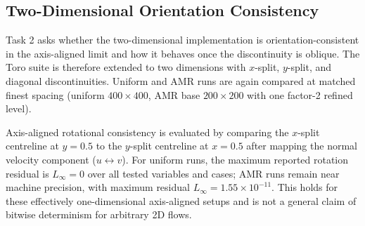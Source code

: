 \documentclass[final,3p,times,twocolumn]{elsarticle}
\newif\ifwithpaths
\DeclareRobustCommand{\pathnote}[1]{\ifwithpaths\textit{ [source: \nolinkurl{#1}]}\fi}
\begin{document}
\begin{table}[!htbp]
\centering
\scriptsize
{}
\caption{Supplementary single-level smooth Gaussian entropy-perturbation test on uniform grids with $\rho=1+0.05\exp(-r^2/0.12^2)$, $(u,v,p)=(0.2,0.15,1.0)$, and $t_\mathrm{end}=0.05$.\pathnote{Euler_AmrLevel/Exec/Euler1D/results_smooth_entropy_convergence_20260306_044020/checks/smooth_entropy_convergence.csv; Euler_AmrLevel/Exec/Euler1D/results_smooth_entropy_convergence_20260306_044020/logs/smooth_num_n128.log}}
\label{tab:smooth_convergence}
\end{table}

\FloatBarrier

\subsection{Two-Dimensional Orientation Consistency}

Task 2 asks whether the two-dimensional implementation is orientation-consistent in the axis-aligned limit and how it behaves once the discontinuity is oblique. The Toro suite is therefore extended to two dimensions with $x$-split, $y$-split, and diagonal discontinuities. Uniform and AMR runs are again compared at matched finest spacing (uniform $400\times400$, AMR base $200\times200$ with one factor-2 refined level).

Axis-aligned rotational consistency is evaluated by comparing the $x$-split centreline at $y=0.5$ to the $y$-split centreline at $x=0.5$ after mapping the normal velocity component ($u\leftrightarrow v$). For uniform runs, the maximum reported rotation residual is $L_\infty=0$ over all tested variables and cases; AMR runs remain near machine precision, with maximum residual $L_\infty=1.55\times10^{-11}$. This holds for these effectively one-dimensional axis-aligned setups and is not a general claim of bitwise determinism for arbitrary 2D flows.
\end{document}
